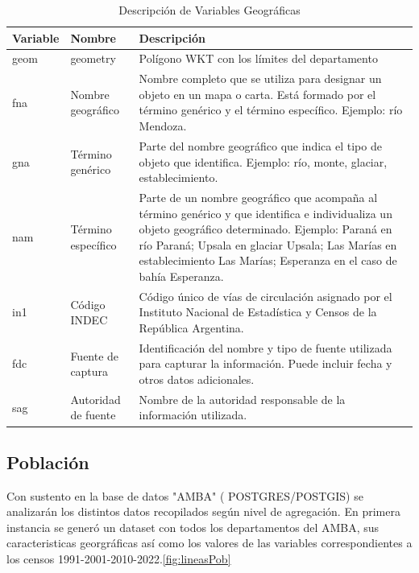 \documentclass{article}
\theoremstyle{mytheoremstyle}
\theoremstyle{mytheoremstyle}
\theoremstyle{myproblemstyle}
\begin{document}
\begin{table}[htbp]
    \centering
    \caption{Descripción de Variables Geográficas}
    \begin{tabular}{|l|l|p{8cm}|}
        \hline
        \textbf{Variable} & \textbf{Nombre} & \textbf{Descripción} \\
        \hline
        geom & geometry & Polígono WKT con los límites del departamento \\
        fna & Nombre geográfico & Nombre completo que se utiliza para designar un objeto en un mapa o carta. Está formado por el término genérico y el término específico. Ejemplo: río Mendoza. \\
        gna & Término genérico & Parte del nombre geográfico que indica el tipo de objeto que identifica. Ejemplo: río, monte, glaciar, establecimiento. \\
        nam & Término específico & Parte de un nombre geográfico que acompaña al término genérico y que identifica e individualiza un objeto geográfico determinado. Ejemplo: Paraná en río Paraná; Upsala en glaciar Upsala; Las Marías en establecimiento Las Marías; Esperanza en el caso de bahía Esperanza. \\
        in1 & Código INDEC & Código único de vías de circulación asignado por el Instituto Nacional de Estadística y Censos de la República Argentina. \\
        fdc & Fuente de captura & Identificación del nombre y tipo de fuente utilizada para capturar la información. Puede incluir fecha y otros datos adicionales. \\
        sag & Autoridad de fuente & Nombre de la autoridad responsable de la información utilizada. \\
        \hline
    \end{tabular}
    \label{tab:geo.depto}
\end{table}




\subsection{Población}

Con sustento en la base de datos "AMBA" ( POSTGRES/POSTGIS) se analizarán los distintos datos recopilados según nivel de agregación.
En primera instancia se  generó un dataset con todos los departamentos del AMBA, sus caracteristicas georgráficas así como los valores
de las variables correspondientes a los censos 1991-2001-2010-2022.\ref{fig:lineasPob}
 
\end{document}
